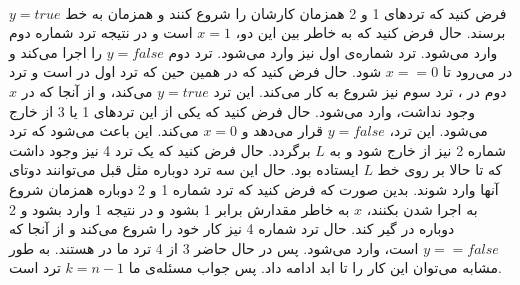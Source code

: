 \\\noindent
فرض کنید که ترد‌های 1 و 2 همزمان کارشان را شروع کنند و همزمان به خط
$y = true$
برسند. حال فرض کنید که به خاطر
بین این دو،
$x = 1$
است و در نتیجه ترد شماره دوم وارد
می‌شود. ترد شماره‌ی اول نیز وارد
می‌شود. ترد دوم
$y = false$
را اجرا می‌کند و در
می‌رود تا
$x == 0$
شود.
حال فرض کنید که در همین حین که ترد اول در
است و ترد دوم در
،
ترد سوم نیز شروع به کار می‌کند. این ترد
$y = true$
می‌کند، و از آنجا که
در
$x$
وجود نداشت، وارد
می‌شود. حال فرض کنید که یکی از این ترد‌های 1 یا 3 از
خارج می‌شود. این ترد،
$y = false$
قرار می‌دهد و
$x = 0$
می‌کند. این باعث می‌شود که ترد شماره 2 نیز از
خارج شود و به
$L$
برگردد. حال فرض کنید که یک ترد 4 نیز وجود داشت که تا حالا بر روی خط
$L$
ایستاده بود. حال این سه ترد دوباره مثل قبل می‌توانند دوتای آنها وارد
شوند. بدین صورت که فرض کنید که ترد شماره 1 و 2 دوباره همزمان  شروع به اجرا شدن بکنند،
$x$
به خاطر
مقدارش برابر
1 بشود
و در نتیجه 1 وارد
بشود و 2 دوباره در
گیر کند. حال ترد شماره 4 نیز کار خود را شروع می‌کند و از آنجا که
$y == false$
است، وارد
می‌شود. پس در حال حاضر 3 از 4 ترد ما در
هستند. به طور مشابه می‌توان این کار را تا ابد ادامه داد. پس جواب مسئله‌ی ما
$k=n-1$
ترد است.